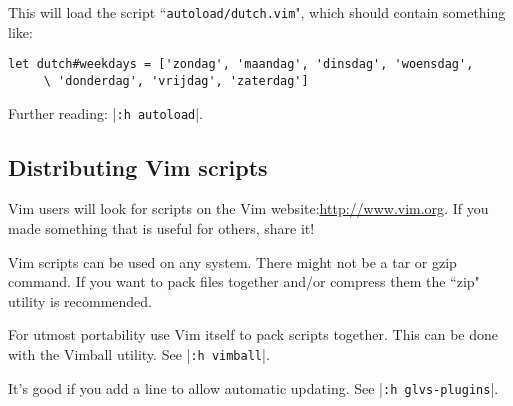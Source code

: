This will load the script ``\texttt{autoload/dutch.vim}", which should contain something like:

\begin{Verbatim}[samepage=true]
 let dutch#weekdays = ['zondag', 'maandag', 'dinsdag', 'woensdag',
     \ 'donderdag', 'vrijdag', 'zaterdag']
\end{Verbatim}

Further reading: |\texttt{:h autoload}|.
\subsection{Distributing Vim scripts}
\label{distribute-script}
Vim users will look for scripts on the Vim website:\url{http://www.vim.org}.
If you made something that is useful for others, share it!

Vim scripts can be used on any system.
There might not be a tar or gzip command.
If you want to pack files together and/or compress them the ``zip" utility is recommended.

For utmost portability use Vim itself to pack scripts together.
This can be done with the Vimball utility.
See |\texttt{:h vimball}|.

It's good if you add a line to allow automatic updating.
See |\texttt{:h glvs-plugins}|.
\clearpage
